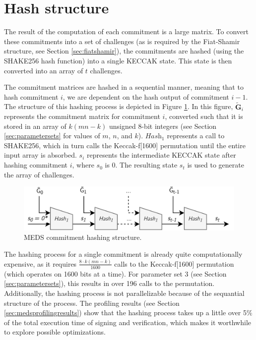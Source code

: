 \documentclass[11pt,a4paper]{report}
\theoremstyle{definition}
\begin{document}
\section{Hash structure}
\label{sec:hashfunctionoptimization}
The result of the computation of each commitment is a large matrix. To convert these commitments into a set of challenges (as is required by the Fiat-Shamir structure, see Section \ref{sec:fiatshamir}), the commitments are hashed (using the SHAKE256 hash function) into a single KECCAK state. This state is then converted into an array of $t$ challenges.

The commitment matrices are hashed in a sequential manner, meaning that to hash commitment $i$, we are dependent on the hash output of commitment $i - 1$. The structure of this hashing process is depicted in Figure \ref{fig:hashstructure}. In this figure, $\tilde{\textbf{G}}_i$ represents the commitment matrix for commitment $i$, converted such that it is stored in an array of $k(mn - k)$ unsigned 8-bit integers (see Section \ref{sec:parametersets} for values of $m$, $n$, and $k$). $\textit{Hash}_1$ represents a call to SHAKE256, which in turn calls the Keccak-f[1600] permutation until the entire input array is absorbed. $s_i$ represents the intermediate KECCAK state after hashing commitment $i$, where $s_0$ is 0. The resulting state $s_t$ is used to generate the array of challenges.

\begin{figure}
  \centering
  \includegraphics[width=\textwidth]{hash/hash_struct_seq.png}
  \caption{MEDS commitment hashing structure.}
  \label{fig:hashstructure}
\end{figure}

The hashing process for a single commitment is already quite computationally expensive, as it requires $\frac{8 \cdot k(mn-k)}{1600}$ calls to the Keccak-f[1600] permutation (which operates on 1600 bits at a time). For parameter set 3 (see Section \ref{sec:parametersets}), this results in over 196 calls to the permutation. Additionally, the hashing process is not parallelizable because of the sequantial structure of the process. The profiling results (see Section \ref{sec:medsprofilingresults}) show that the hashing process takes up a little over 5\% of the total execution time of signing and verification, which makes it worthwhile to explore possible optimizations.
\end{document}
